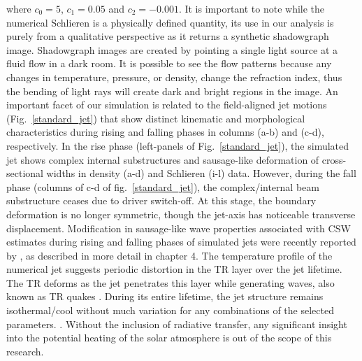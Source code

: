 where $c_0=5$, $c_1=0.05$ and $c_2=-0.001$. It is important to note while the numerical Schlieren is a physically defined quantity, its use in our analysis is purely from a qualitative perspective as it returns a synthetic shadowgraph image. Shadowgraph images are created by pointing a single light source at a fluid flow in a dark room. It is possible to see the flow patterns because any changes in temperature, pressure, or density, change the refraction index, thus the bending of light rays will create dark and bright regions in the image. An important facet of our simulation is related to the field-aligned jet motions (Fig.~\ref{standard_jet}) that show distinct kinematic and morphological characteristics during rising and falling phases in columns (a-b) and (c-d), respectively. In the rise phase (left-panels of Fig.~\ref{standard_jet}), the simulated jet shows complex internal substructures and sausage-like deformation of cross-sectional widths in density (a-d) and Schlieren (i-l) data. However, during the fall phase (columns of c-d of fig.~\ref{standard_jet}), the complex/internal beam substructure ceases due to driver switch-off. At this stage, the boundary deformation is no longer symmetric, though the jet-axis has noticeable transverse displacement. Modification in sausage-like wave properties associated with CSW estimates during rising and falling phases of simulated jets were recently reported by \cite{Dover2020ApJ90572D}, as described in more detail in chapter 4. The temperature profile of the numerical jet suggests periodic distortion in the TR layer over the jet lifetime. The TR deforms as the jet penetrates this layer while generating waves, also known as TR quakes \citep{Scullion2011}. During its entire lifetime, the jet structure remains isothermal/cool without much variation for any combinations of the selected parameters. . Without the inclusion of radiative transfer, any significant insight into the potential heating of the solar atmosphere is out of the scope of this research. \np
